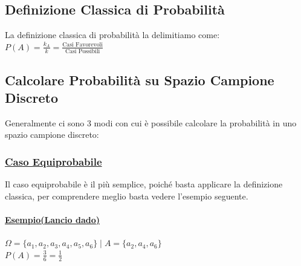 \documentclass{article}
\begin{document}
\subsection{Definizione Classica di Probabilità}
La definizione classica di probabilità la delimitiamo come: $P(A) = \frac{k_A}{k} = \frac{\text{Casi Favorevoli}}{\text{Casi Possibili}}
$
\subsection{Calcolare Probabilità su Spazio Campione Discreto}
Generalmente ci sono 3 modi con cui è possibile calcolare la probabilità in uno spazio campione discreto:
\subsubsection{\underline{Caso Equiprobabile}}
Il caso equiprobabile è il più semplice, poiché basta applicare la definizione classica, per comprendere meglio basta vedere l’esempio seguente.
\paragraph{\underline{Esempio(Lancio dado)}}
$\Omega= \{a_1, a_2, a_3, a_4, a_5, a_6 \} \; \big| \; A= \{ a_2, a_4, a_6\}$ \\
$P(A) = \frac{3}{6} = \frac 12$
\end{document}
